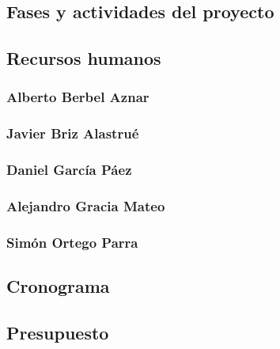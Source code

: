 \documentclass[11pt,spanish]{article}
\begin{document}
\subsection{Fases y actividades del proyecto}


\newpage
\subsection{Recursos humanos}


\subsubsection{Alberto Berbel Aznar}


\newpage
\subsubsection{Javier Briz Alastrué}


\newpage
%

\newpage
\subsubsection{Daniel García Páez}


\newpage
\subsubsection{Alejandro Gracia Mateo}


\newpage
\subsubsection{Simón Ortego Parra}


\newpage
\subsection{Cronograma}


\subsection{Presupuesto}

\end{document}
